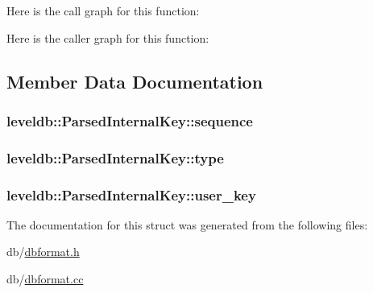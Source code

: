 Here is the call graph for this function\-:




Here is the caller graph for this function\-:




\subsection{Member Data Documentation}
\hypertarget{structleveldb_1_1_parsed_internal_key_a3ab7f4382bc026081875fde4dea95e61}{
\subsubsection[{sequence}]{ leveldb\-::\-Parsed\-Internal\-Key\-::sequence}}\label{structleveldb_1_1_parsed_internal_key_a3ab7f4382bc026081875fde4dea95e61}
\hypertarget{structleveldb_1_1_parsed_internal_key_ac7c10a6f60f93982b886ad1fbbafd6c2}{
\subsubsection[{type}]{ leveldb\-::\-Parsed\-Internal\-Key\-::type}}\label{structleveldb_1_1_parsed_internal_key_ac7c10a6f60f93982b886ad1fbbafd6c2}
\hypertarget{structleveldb_1_1_parsed_internal_key_aa6e30fcf3c95fc1485d60fa08efe2b9d}{
\subsubsection[{user\-\_\-key}]{ leveldb\-::\-Parsed\-Internal\-Key\-::user\-\_\-key}}\label{structleveldb_1_1_parsed_internal_key_aa6e30fcf3c95fc1485d60fa08efe2b9d}


The documentation for this struct was generated from the following files\-:\begin{DoxyCompactItemize}
\item 
db/\hyperlink{dbformat_8h}{dbformat.\-h}\item 
db/\hyperlink{dbformat_8cc}{dbformat.\-cc}\end{DoxyCompactItemize}
